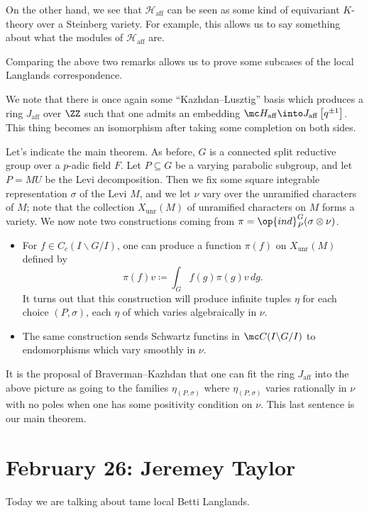 \documentclass{article}
\begin{document}
\begin{remark}
	On the other hand, we see that $\mathcal H_{\mathrm{aff}}$ can be seen as some kind of equivariant $K$-theory over a Steinberg variety. For example, this allows us to say something about what the modules of $\mathcal H_{\mathrm{aff}}$ are.
\end{remark}
Comparing the above two remarks allows us to prove some subcases of the local Langlands correspondence.
\begin{remark}
	We note that there is once again some ``Kazhdan--Lusztig'' basis which produces a ring $J_{\mathrm{aff}}$ over $\ZZ$ such that one admits an embedding $\mc H_{\mathrm{aff}}\into J_{\mathrm{aff}}\left[q^{\pm1}\right]$. This thing becomes an isomorphism after taking some completion on both sides.
\end{remark}
Let's indicate the main theorem. As before, $G$ is a connected split reductive group over a $p$-adic field $F$. Let $P\subseteq G$ be a varying parabolic subgroup, and let $P=MU$ be the Levi decomposition. Then we fix some square integrable representation $\sigma$ of the Levi $M$, and we let $\nu$ vary over the unramified characters of $M$; note that the collection $X_{\mathrm{unr}}(M)$ of unramified characters on $M$ forms a variety. We now note two constructions coming from $\pi=\op{ind}_P^G(\sigma\otimes\nu)$.
\begin{itemize}
	\item For $f\in C_c(I\backslash G/I)$, one can produce a function $\pi(f)$ on $X_{\mathrm{unr}}(M)$ defined by
	\[\pi(f)v\coloneqq\int_Gf(g)\pi(g)v\,dg.\]
	It turns out that this construction will produce infinite tuples $\eta$ for each choice $(P,\sigma)$, each $\eta$ of which varies algebraically in $\nu$.
	\item The same construction sends Schwartz functins in $\mc C(I\backslash G/I)$ to endomorphisms which vary smoothly in $\nu$.
\end{itemize}
It is the proposal of Braverman--Kazhdan that one can fit the ring $J_{\mathrm{aff}}$ into the above picture as going to the families $\eta_{(P,\sigma)}$ where $\eta_{(P,\sigma)}$ varies rationally in $\nu$ with no poles when one has some positivity condition on $\nu$. This last sentence is our main theorem.

\section{February 26: Jeremey Taylor}
Today we are talking about tame local Betti Langlands.
\end{document}
